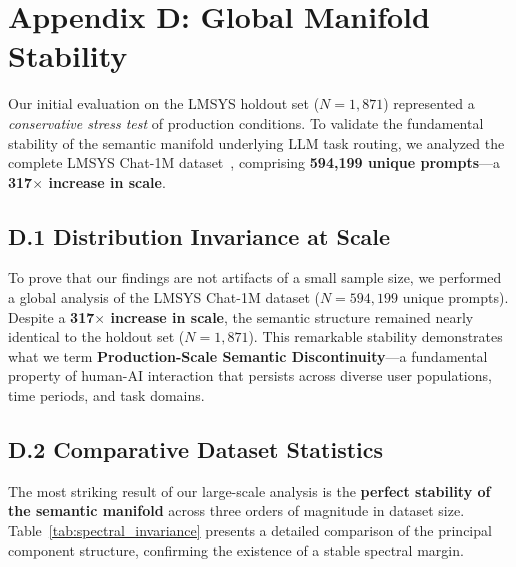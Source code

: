 
\section{Appendix D: Global Manifold Stability}
\label{appendix:global_manifold}

Our initial evaluation on the LMSYS holdout set ($N=1,871$) represented a \emph{conservative stress test} of production conditions. To validate the fundamental stability of the semantic manifold underlying LLM task routing, we analyzed the complete LMSYS Chat-1M dataset~\cite{zheng2023lmsys}, comprising \textbf{594,199 unique prompts}---a \textbf{317$\times$ increase in scale}.

\subsection{D.1 Distribution Invariance at Scale}

To prove that our findings are not artifacts of a small sample size, we performed a global analysis of the LMSYS Chat-1M dataset ($N=594,199$ unique prompts). Despite a \textbf{317$\times$ increase in scale}, the semantic structure remained nearly identical to the holdout set ($N=1,871$). This remarkable stability demonstrates what we term \textbf{Production-Scale Semantic Discontinuity}—a fundamental property of human-AI interaction that persists across diverse user populations, time periods, and task domains.

\subsection{D.2 Comparative Dataset Statistics}

The most striking result of our large-scale analysis is the \textbf{perfect stability of the semantic manifold} across three orders of magnitude in dataset size. Table~\ref{tab:spectral_invariance} presents a detailed comparison of the principal component structure, confirming the existence of a stable spectral margin.

